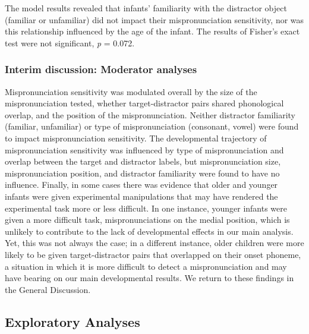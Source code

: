 \documentclass[
  man, noextraspace]{apa6}
\begin{document}
The model results revealed that infants' familiarity with the distractor object (familiar or unfamiliar) did not impact their mispronunciation sensitivity, nor was this relationship influenced by the age of the infant. The results of Fisher's exact test were not significant, \emph{p} = 0.072.

\hypertarget{interim-discussion-moderator-analyses}{%
\subsubsection{Interim discussion: Moderator analyses}\label{interim-discussion-moderator-analyses}}

Mispronunciation sensitivity was modulated overall by the size of the mispronunciation tested, whether target-distractor pairs shared phonological overlap, and the position of the mispronunciation. Neither distractor familiarity (familiar, unfamiliar) or type of mispronunciation (consonant, vowel) were found to impact mispronunciation sensitivity. The developmental trajectory of mispronunciation sensitivity was influenced by type of mispronunciation and overlap between the target and distractor labels, but mispronunciation size, mispronunciation position, and distractor familiarity were found to have no influence. Finally, in some cases there was evidence that older and younger infants were given experimental manipulations that may have rendered the experimental task more or less difficult. In one instance, younger infants were given a more difficult task, mispronunciations on the medial position, which is unlikely to contribute to the lack of developmental effects in our main analysis. Yet, this was not always the case; in a different instance, older children were more likely to be given target-distractor pairs that overlapped on their onset phoneme, a situation in which it is more difficult to detect a mispronunciation and may have bearing on our main developmental results. We return to these findings in the General Discussion.

\hypertarget{exploratory-analyses}{%
\subsection{Exploratory Analyses}\label{exploratory-analyses}}
\end{document}
